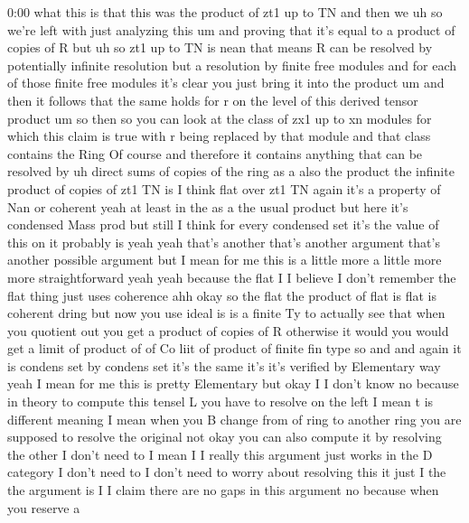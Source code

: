 \begin{unfinished}{0:00}
what  this  is  that  this  was  the  product
of  zt1  up  to
TN  and  then
we  uh  so  we're  left  with  just  analyzing
this  um  and  proving  that  it's  equal  to  a
product  of  copies  of  R
but  uh  so
zt1  up  to  TN  is
nean  that  means  R  can  be
resolved  by  potentially  infinite
resolution  but  a  resolution  by  finite
free
modules  and  for  each  of  those  finite
free  modules  it's  clear  you  just  bring
it  into  the  product  um  and  then  it
follows  that  the  same  holds  for  r  on  the
level  of  this  derived  tensor
product  um  so  then
so  you  can  look  at  the  class  of  zx1  up
to  xn  modules  for  which  this  claim  is
true  with  r  being  replaced  by  that
module  and  that  class  contains  the  Ring
Of  course  and  therefore  it  contains
anything  that  can  be  resolved  by  uh
direct  sums  of  copies  of  the  ring  as  a
also  the  product  the  infinite  product  of
copies  of  zt1  TN  is  I  think  flat  over
zt1  TN  again  it's  a  property  of  Nan  or
coherent  yeah  at  least  in  the  as  a  the
usual  product  but  here  it's  condensed
Mass  prod  but  still  I  think  for  every
condensed  set  it's  the  value  of  this  on
it  probably  is  yeah  yeah  that's  another
that's  another  argument  that's  another
possible  argument  but  I  mean  for  me  this
is  a  little
more  a  little  more  more
straightforward
yeah  yeah  because  the  flat  I  I  believe  I
don't  remember  the  flat  thing  just
uses
coherence  ahh  okay  so  the  flat  the
product  of  flat  is  flat  is  coherent
dring  but  now  you  use  ideal  is  is  a
finite  Ty  to  actually  see  that  when  you
quotient  out  you  get  a  product  of  copies
of  R  otherwise  it  would  you  would  get  a
limit  of  product
of  of  Co  liit  of  product  of
finite  fin  type  so
and  and  again  it  is  condens  set  by
condens  set  it's  the  same  it's  it's
verified  by  Elementary  way  yeah  I  mean
for  me  this  is  pretty  Elementary  but
okay  I  I  don't  know  no  because  in  theory
to  compute  this
tensel  L  you  have  to  resolve  on  the  left
I  mean  t  is  different  meaning  I  mean
when  you  B  change  from  of  ring  to
another  ring  you  are  supposed  to  resolve
the
original  not  okay  you  can  also  compute
it  by
resolving  the
other  I  don't  need  to  I  mean  I  I  really
this  argument  just  works  in  the  D
category  I  don't  need  to  I  don't  need  to
worry  about  resolving  this  it  just  I  the
the  argument  is  I  I  claim  there  are  no
gaps  in  this
argument  no  because  when  you  reserve  a

\end{unfinished}
